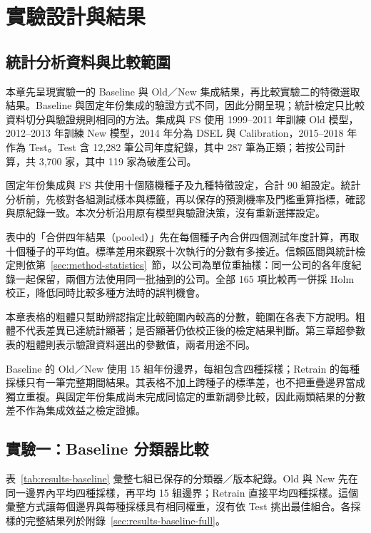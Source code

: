 \chapter{實驗設計與結果}\label{chap:results}
\begingroup
\setlength{\emergencystretch}{2em}

\section{統計分析資料與比較範圍}

本章先呈現實驗一的 Baseline 與 Old／New 集成結果，再比較實驗二的特徵選取結果。Baseline 與固定年份集成的驗證方式不同，因此分開呈現；統計檢定只比較資料切分與驗證規則相同的方法。集成與 FS 使用 1999--2011 年訓練 Old 模型，2012--2013 年訓練 New 模型，2014 年分為 DSEL 與 Calibration，2015--2018 年作為 Test。Test 含 12,282 筆公司年度紀錄，其中 287 筆為正類；若按公司計算，共 3,700 家，其中 119 家為破產公司。

固定年份集成與 FS 共使用十個隨機種子及九種特徵設定，合計 90 組設定。統計分析前，先核對各組測試樣本與標籤，再以保存的預測機率及門檻重算指標，確認與原紀錄一致。本次分析沿用原有模型與驗證決策，沒有重新選擇設定。

表中的「合併四年結果（pooled）」先在每個種子內合併四個測試年度計算，再取十個種子的平均值。標準差用來觀察十次執行的分數有多接近。信賴區間與統計檢定則依第~\ref{sec:method-statistics}~節，以公司為單位重抽樣：同一公司的各年度紀錄一起保留，兩個方法使用同一批抽到的公司。全部 165 項比較再一併採 Holm 校正，降低同時比較多種方法時的誤判機會。

本章表格的粗體只幫助辨認指定比較範圍內較高的分數，範圍在各表下方說明。粗體不代表差異已達統計顯著；是否顯著仍依校正後的檢定結果判斷。第三章超參數表的粗體則表示驗證資料選出的參數值，兩者用途不同。

Baseline 的 Old／New 使用 15 組年份邊界，每組包含四種採樣；Retrain 的每種採樣只有一筆完整期間結果。其表格不加上跨種子的標準差，也不把重疊邊界當成獨立重複。與固定年份集成尚未完成同協定的重新調參比較，因此兩類結果的分數差不作為集成效益之檢定證據。

\section{實驗一：Baseline 分類器比較}\label{sec:results-baseline}

表~\ref{tab:results-baseline} 彙整七組已保存的分類器／版本紀錄。Old 與 New 先在同一邊界內平均四種採樣，再平均 15 組邊界；Retrain 直接平均四種採樣。這個彙整方式讓每個邊界與每種採樣具有相同權重，沒有依 Test 挑出最佳組合。各採樣的完整結果列於附錄~\ref{sec:results-baseline-full}。

